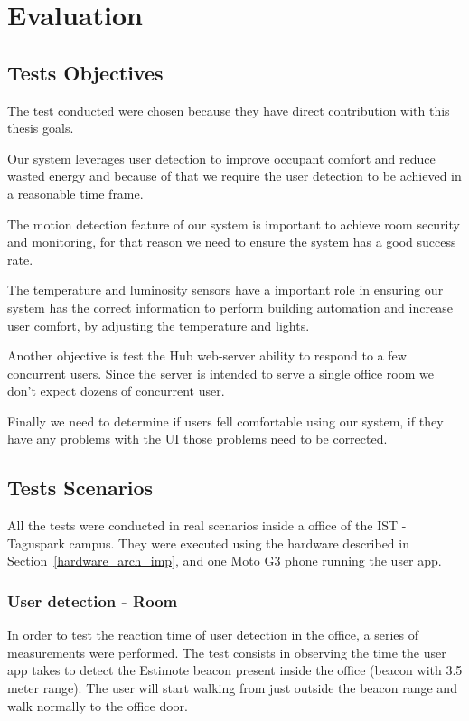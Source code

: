 \chapter{Evaluation}
\label{chapter:evaluation}

\section{Tests Objectives}

The test conducted were chosen because they have direct contribution with this thesis goals.

Our system leverages user detection to improve occupant comfort and reduce wasted energy and because of that we require the user detection to be achieved in a reasonable time frame.

The motion detection feature of our system is important to achieve room security and monitoring, for that reason we need to ensure the system has a good success rate. 

The temperature and luminosity sensors have a important role in ensuring our system has the correct information to perform building automation and increase user comfort, by adjusting the temperature and lights. 

Another objective is test the Hub web-server ability to respond to a few concurrent users. Since the server is intended to serve a single office room we don't expect dozens of concurrent user.

Finally we need to determine if users fell comfortable using our system, if they have any problems with the \ac{UI} those problems need to be corrected.


\section{Tests Scenarios}



All the tests were conducted in real scenarios inside a office of the \ac{IST} - Taguspark campus. They
were executed using the hardware described in Section~\ref{hardware_arch_imp}, and one Moto G3 phone running the user app.


\subsection{User detection - Room}


In order to test the reaction time of user detection in the office, a series of measurements were performed. The test consists in observing the time the user app takes to detect the Estimote beacon present inside the office (beacon with 3.5 meter range). The user will start walking from just outside the beacon range and walk normally to the office door.

